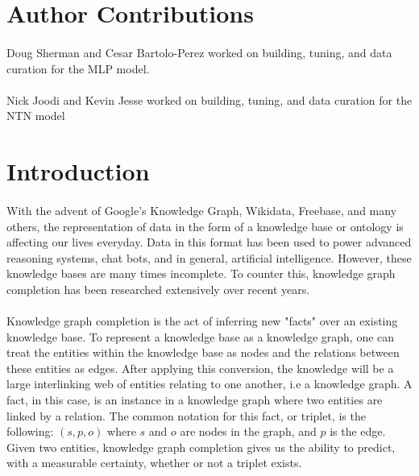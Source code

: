 \documentclass[11.5pt]{article}
\begin{document}
\pagebreak

\tableofcontents

\vfill
\section*{Author Contributions}
\paragraph{}
Doug Sherman and Cesar Bartolo-Perez worked on building, tuning, and data curation for the MLP model. 
\paragraph{}
Nick Joodi and Kevin Jesse worked on building, tuning, and data curation for the NTN model

\pagebreak

\section{Introduction}
\paragraph{} With the advent of Google's Knowledge Graph, Wikidata, Freebase, and many others, the representation of data in the form of a knowledge base or ontology is affecting our lives everyday. Data in this format has been used to power advanced reasoning systems, chat bots, and in general, artificial intelligence. However, these knowledge bases are many times incomplete. To counter this, knowledge graph completion has been researched extensively over recent years. 

\paragraph{} Knowledge graph completion is the act of inferring new "facts" over an existing knowledge base. To represent a knowledge base as a knowledge graph, one can treat the entities within the knowledge base as nodes and the relations between these entities as edges. After applying this conversion, the knowledge will be a large interlinking web of entities relating to one another, i.e a knowledge graph. A fact, in this case, is an instance in a knowledge graph where two entities are linked by a relation. The common notation for this fact, or triplet, is the following:  $(s,p,o) $ where $s$ and $o$ are nodes in the graph, and $p$ is the edge. Given two entities, knowledge graph completion gives us the ability to predict, with a measurable certainty, whether or not a triplet exists.
\end{document}
